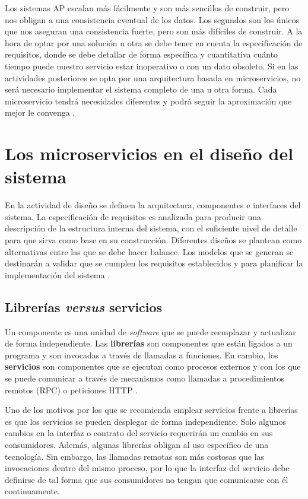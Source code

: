 \documentclass[11pt,spanish,listoffigures]{tfgetsinf}
\begin{document}
Los sistemas AP escalan más fácilmente y son más sencillos de construir, pero nos obligan a una consistencia eventual de los datos. Los segundos son los únicos que nos aseguran una consistencia fuerte, pero son más difíciles de construir. A la hora de optar por una solución u otra se debe tener en cuenta la especificación de requisitos, donde se debe detallar de forma específica y cuantitativa cuánto tiempo puede nuestro servicio estar inoperativo o con un dato obsoleto. Si en las actividades posteriores se opta por una arquitectura basada en microservicios, no será necesario implementar el sistema completo de una u otra forma. Cada microservicio tendrá necesidades diferentes y podrá seguir la aproximación que mejor le convenga \cite{Newman2015a}.

\section{Los microservicios en el diseño del sistema} \label{sct:FaseDiseño}

En la actividad de diseño se definen la arquitectura, componentes e interfaces del sistema. La especificación de requisitos es analizada para producir una descripción de la estructura interna del sistema, con el suficiente nivel de detalle para que sirva como base en su construcción. Diferentes diseños se plantean como alternativas entre las que se debe hacer balance. Los modelos que se generan se destinarán a validar que se cumplen los requisitos establecidos y para planificar la implementación del sistema \cite{Bourque2014}.

\subsection{Librerías \textit{versus} servicios} \label{subsect:librerias}

Un componente es una unidad de \textit{software} que se puede reemplazar y actualizar de forma independiente. Las \textbf{librerías} son componentes que están ligados a un programa y son invocadas a través de llamadas a funciones. En cambio, los \textbf{servicios} son componentes que se ejecutan como procesos externos y con los que se puede comunicar a través de mecanismos como llamadas a procedimientos remotos (RPC) o peticiones HTTP \cite{Lewis2014}.

Uno de los motivos por los que se recomienda emplear servicios frente a librerías es que los servicios se pueden desplegar de forma independiente. Solo algunos cambios en la interfaz o contrato del servicio requerirán un cambio en sus consumidores. Además, algunas librerías obligan al uso específico de una tecnología. Sin embargo, las llamadas remotas son más costosas que las invocaciones dentro del mismo proceso, por lo que la interfaz del servicio debe definirse de tal forma que sus consumidores no tengan que comunicarse con él continuamente.
\end{document}
